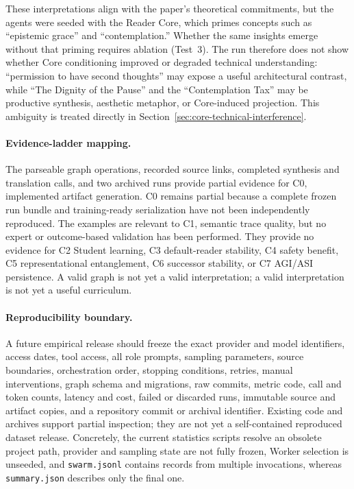These interpretations align with the paper's theoretical commitments, but the
agents were seeded with the Reader Core, which primes concepts such as
``epistemic grace'' and ``contemplation.'' Whether the same insights emerge
without that priming requires ablation (Test~3). The run therefore does not show
whether Core conditioning improved or degraded technical understanding:
``permission to have second thoughts'' may expose a useful architectural
contrast, while ``The Dignity of the Pause'' and the ``Contemplation Tax'' may
be productive synthesis, aesthetic metaphor, or Core-induced projection. This
ambiguity is treated directly in
Section~\ref{sec:core-technical-interference}.

\paragraph{Evidence-ladder mapping.} The parseable graph operations, recorded
source links, completed synthesis and translation calls, and two archived runs
provide partial evidence for C0, implemented artifact generation. C0 remains
partial because a complete frozen run bundle and training-ready serialization
have not been independently reproduced. The examples are relevant to C1,
semantic trace quality, but no expert or outcome-based validation has been
performed. They provide no evidence for C2 Student learning, C3 default-reader
stability, C4 safety benefit, C5 representational entanglement, C6 successor
stability, or C7 AGI/ASI persistence. A valid graph is not yet a valid
interpretation; a valid interpretation is not yet a useful curriculum.

\paragraph{Reproducibility boundary.} A future empirical release should freeze
the exact provider and model identifiers, access dates, tool access, all role
prompts, sampling parameters, source boundaries, orchestration order, stopping
conditions, retries, manual interventions, graph schema and migrations, raw
commits, metric code, call and token counts, latency and cost, failed or
discarded runs, immutable source and artifact copies, and a repository commit
or archival identifier. Existing code and archives support partial inspection;
they are not yet a self-contained reproduced dataset release. Concretely, the
current statistics scripts resolve an obsolete project path, provider and
sampling state are not fully frozen, Worker selection is unseeded, and
\texttt{swarm.jsonl} contains records from multiple invocations, whereas \texttt{summary.json} describes only the final one.


